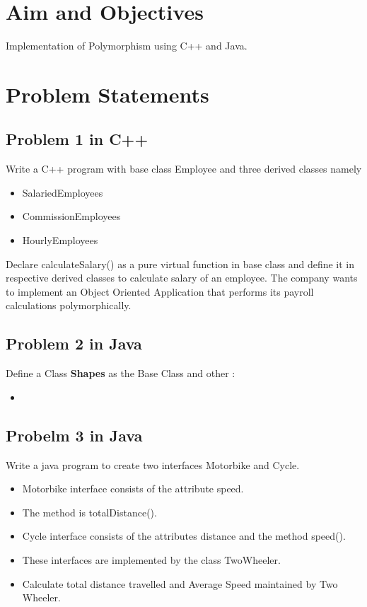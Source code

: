 \documentclass[11pt]{article}
\begin{document}
\tableofcontents
\thispagestyle{empty}
\clearpage


\setcounter{page}{1}

\section{Aim and Objectives}
Implementation of Polymorphism using C++ and Java.
\section{Problem Statements}
\subsection{Problem 1 in C++}

Write a C++ program with base class Employee and three derived classes namely
\begin{itemize}
	\item SalariedEmployees
	\item CommissionEmployees
	\item HourlyEmployees
\end{itemize}

Declare calculateSalary() as a pure virtual function in base class and define it in respective
derived classes to calculate salary of an employee.
The company wants to implement an Object Oriented Application that performs its payroll
calculations polymorphically.


\subsection{Problem 2 in Java}

Define a Class \textbf{Shapes} as the Base Class and other : 
\begin{itemize}
	\item 
\end{itemize}

\subsection{Probelm 3 in Java}
Write a java program to create two interfaces Motorbike and Cycle.
\begin{itemize}
	\item Motorbike interface consists of the attribute speed.
	\item The method is totalDistance().
	\item Cycle interface consists of the attributes distance and the method speed().
	\item These interfaces are implemented by the class TwoWheeler.
	\item Calculate total distance travelled and Average Speed maintained by Two Wheeler.
\end{itemize}
\end{document}
